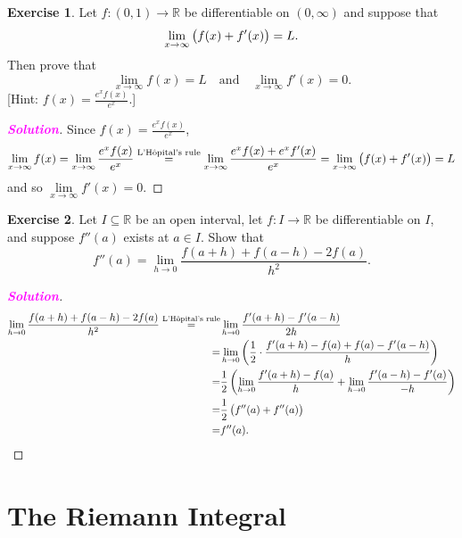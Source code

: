 \documentclass[12pt,openany]{book}
\theoremstyle{definition}
\newtheorem{exercise}{Exercise}[chapter]
\newcommand{\R}{\mathbb{R}}
\newcommand{\sol}{\textcolor{magenta}{\bf Solution}}
\begin{document}
	\vspace{20pt}
	\begin{tcolorbox}[colframe=execolor, title={\color{white}\bf}]
	\begin{exercise}
		Let $f:(0,1)\to\R$ be differentiable on $(0,\infty)$ and suppose that \[
		\lim\limits_{x\to\infty}\del{f(x)+f'(x)}=L.
		\] Then prove that \[
		\lim\limits_{x\to\infty}f(x)=L\quad\text{and}\quad\lim\limits_{x\to \infty}f'(x)=0.
		\]
		\textcolor{gray!50!white}{[Hint: $f(x)=\frac{e^xf(x)}{e^x}$.]}
	\end{exercise}
	\end{tcolorbox}
	\begin{proof}[\sol]
		Since $f(x)=\frac{e^xf(x)}{e^x}$, \[
		\lim\limits_{x\to\infty}f(x)=
		\lim\limits_{x\to\infty}\frac{e^xf(x)}{e^x}\overset{\text{L'H\^{o}pital's rule}}{=}
		\lim\limits_{x\to\infty}\frac{e^xf(x)+e^xf'(x)}{e^x}=
		\lim\limits_{x\to\infty}\del{f(x)+f'(x)}=L
		\] and so $\lim\limits_{x\to\infty}f'(x)=0$.
	\end{proof}
	\vspace{20pt}
	\begin{tcolorbox}[colframe=execolor, title={\color{white}\bf}]
	\begin{exercise}
		Let $I\subseteq\R$ be an open interval, let $f:I\to\R$ be differentiable on $I$, and suppose $f''(a)$ exists at $a\in I$. Show that \[
		f''(a)=\lim\limits_{h\to 0}\frac{f(a+h)+f(a-h)-2f(a)}{h^2}.
		\]
	\end{exercise}
	\end{tcolorbox}
	\begin{proof}[\sol]
		\begin{align*}
			\lim\limits_{h\to 0}\frac{f(a+h)+f(a-h)-2f(a)}{h^2}\overset{\text{L'H\^{o}pital's rule}}{=}&
			\lim\limits_{h\to 0}\frac{f'(a+h)-f'(a-h)}{2h}\\=&
			\lim\limits_{h\to 0}\del{\frac{1}{2}\cdot\frac{f'(a+h)-f(a)+f(a)-f'(a-h)}{h}}\\
			=&\frac{1}{2}\del{\lim\limits_{h\to 0}\frac{f'(a+h)-f(a)}{h}+\lim\limits_{h\to 0}\frac{f'(a-h)-f'(a)}{-h}}\\
			=&\frac{1}{2}\del{f''(a)+f''(a)}\\
			=&f''(a).
		\end{align*}
	\end{proof}

	\newpage
	\chapter{The Riemann Integral}
	
\end{document}
